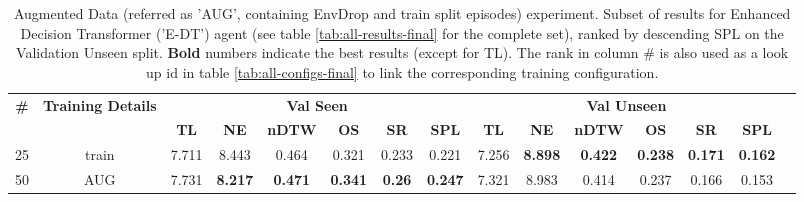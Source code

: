 \begin{table}
\centering
\caption{\label{tab:e_dt_env_drop}Augmented Data (referred as 'AUG', containing EnvDrop and train split episodes) experiment. Subset of results for Enhanced Decision Transformer ('E-DT') agent (see table \ref{tab:all-results-final} for the complete set), ranked by descending SPL on the Validation Unseen split. \textbf{Bold} numbers indicate the best results (except for TL). The rank in column \# is also used as a look up id in table \ref{tab:all-configs-final} to link the corresponding training configuration.}
\begin{tabular}{@{\hskip3pt}c@{\hskip3pt}c@{\hskip3pt}c@{\hskip3pt}c@{\hskip3pt}c@{\hskip3pt}c@{\hskip3pt}c@{\hskip3pt}c@{\hskip3pt}c@{\hskip3pt}c@{\hskip3pt}c@{\hskip3pt}c@{\hskip3pt}c@{\hskip3pt}c@{\hskip3pt}c}
\toprule
                                  \textbf{\#} & \textbf{Training Details} & \multicolumn{6}{c}{\textbf{Val Seen}} & \multicolumn{6}{c}{\textbf{Val Unseen}} \\
\cmidrule(l){3-8}\cmidrule(l){9-14}\textbf{~} &                \textbf{~} &       \textbf{TL} &     \textbf{NE} &   \textbf{nDTW} &     \textbf{OS} &    \textbf{SR} &    \textbf{SPL} &         \textbf{TL} &     \textbf{NE} &   \textbf{nDTW} &     \textbf{OS} &     \textbf{SR} &    \textbf{SPL} \\
\midrule
                                           25 &                     train &             7.711 &           8.443 &           0.464 &           0.321 &          0.233 &           0.221 &               7.256 &  \textbf{8.898} &  \textbf{0.422} &  \textbf{0.238} &  \textbf{0.171} &  \textbf{0.162} \\
                                           50 &                       AUG &             7.731 &  \textbf{8.217} &  \textbf{0.471} &  \textbf{0.341} &  \textbf{0.26} &  \textbf{0.247} &               7.321 &           8.983 &           0.414 &           0.237 &           0.166 &           0.153 \\
\bottomrule
\end{tabular}
\end{table}
